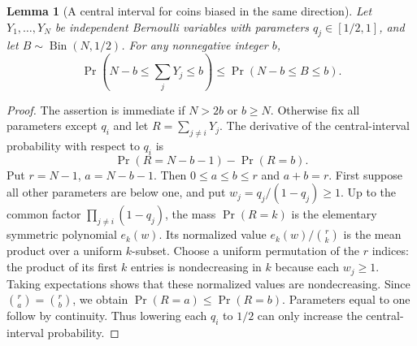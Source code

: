 \documentclass[11pt]{article}
\newtheorem{lemma}{Lemma}
\begin{document}
\begin{lemma}[A central interval for coins biased in the same direction]
Let $Y_1,\ldots,Y_N$ be independent Bernoulli variables with parameters
$q_j\in[1/2,1]$, and let $B\sim\operatorname{Bin}(N,1/2)$.
For any nonnegative integer $b$,
\[
 \Pr\left(N-b\leq\sum_jY_j\leq b\right)
 \leq \Pr(N-b\leq B\leq b).
\]
\end{lemma}
\begin{proof}
The assertion is immediate if $N>2b$ or $b\geq N$.
Otherwise fix all parameters except $q_i$ and let $R=\sum_{j\ne i}Y_j$.
The derivative of the central-interval probability with respect to $q_i$ is
\[
 \Pr(R=N-b-1)-\Pr(R=b).
\]
Put $r=N-1$, $a=N-b-1$. Then $0\leq a\leq b\leq r$ and $a+b=r$.
First suppose all other parameters are below one, and put
$w_j=q_j/(1-q_j)\geq1$. Up to the common factor
$\prod_{j\ne i}(1-q_j)$, the mass $\Pr(R=k)$ is the elementary symmetric
polynomial $e_k(w)$. Its normalized value $e_k(w)/\binom rk$ is the
mean product over a uniform $k$-subset. Choose a uniform permutation of
the $r$ indices: the product of its first $k$ entries is nondecreasing
in $k$ because each $w_j\geq1$. Taking expectations shows that these
normalized values are nondecreasing. Since $\binom ra=\binom rb$,
we obtain $\Pr(R=a)\leq\Pr(R=b)$. Parameters equal to one follow by
continuity. Thus lowering each $q_i$ to $1/2$ can only increase the
central-interval probability.
\end{proof}
\end{document}
